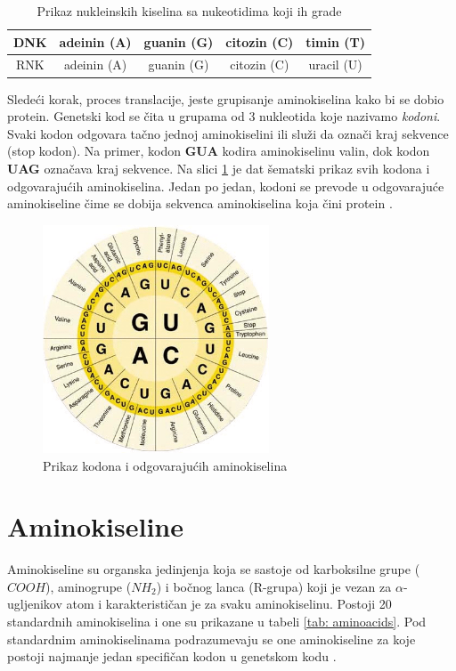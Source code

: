 \begin{table}[H]
	\centering
	\begin{tabular}{|c|c|c|c|c|}
		\hline
		DNK & adeinin (A) & guanin (G) & citozin (C) & timin (T) \\
		\hline
		RNK & adeinin (A) & guanin (G) & citozin (C) & uracil (U) \\
		\hline             
	\end{tabular}
	\caption{Prikaz nukleinskih kiselina sa nukeotidima koji ih grade}
	\label{tab: nucleotides}
\end{table}


Sledeći korak, proces translacije, jeste grupisanje aminokiselina kako bi se dobio protein. Genetski kod se čita u grupama od 3 nukleotida koje nazivamo \textit{kodoni}. Svaki kodon odgovara tačno jednoj aminokiselini ili služi da označi kraj sekvence (stop kodon). Na primer, kodon \textbf{GUA} kodira aminokiselinu valin, dok kodon \textbf{UAG} označava kraj sekvence. Na slici \ref{fig:codons} je dat šematski prikaz svih kodona i odgovarajućih aminokiselina. Jedan po jedan, kodoni se prevode u odgovarajuće aminokiseline čime se dobija sekvenca aminokiselina koja čini protein \cite{BMBG, synthesisOnl}.

\begin{figure}[h]
	\centering
	\includegraphics[width=0.6\textwidth]{Figures/codons_chart.png}
	\caption{Prikaz kodona i odgovarajućih aminokiselina}
	\label{fig:codons}
\end{figure}


\section{Aminokiseline}

Aminokiseline su organska jedinjenja koja se sastoje od karboksilne grupe ($COOH$), aminogrupe ($NH_2$) i bočnog lanca (R-grupa) koji je vezan za $\alpha$-ugljenikov atom i karakterističan je za svaku aminokiselinu. Postoji 20 standardnih aminokiselina i one su prikazane u tabeli \ref{tab: aminoacids}. Pod standardnim aminokiselinama podrazumevaju se one aminokiseline za koje postoji najmanje jedan specifičan kodon u genetskom kodu \cite{biochemestry5, biohUdz, straus}.


